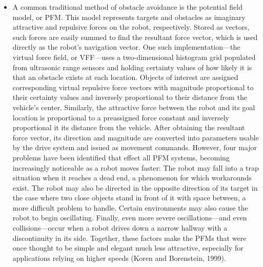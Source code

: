 \documentclass{article}
\begin{document}
\begin{itemize}
\item{A common traditional method of obstacle avoidance is the potential field model, or PFM.  This model represents targets and obstacles as imaginary attractive and repulsive forces on the robot, respectively.  Stored as vectors, such forces are easily summed to find the resultant force vector, which is used directly as the robot's navigation vector.  One such implementation---the virtual force field, or VFF---uses a two-dimensional histogram grid populated from ultrasonic range sensors and holding certainty values of how likely it is that an obstacle exists at each location.  Objects of interest are assigned corresponding virtual repulsive force vectors with magnitude proportional to their certainty values and inversely proportional to their distance from the vehicle's center.  Similarly, the attractive force between the robot and its goal location is proportional to a preassigned force constant and inversely proportional it its distance from the vehicle.  After obtaining the resultant force vector, its direction and magnitude are converted into parameters usable by the drive system and issued as movement commands.  However, four major problems have been identified that effect all PFM systems, becoming increasingly noticeable as a robot moves faster:  The robot may fall into a trap situation when it reaches a dead end, a phenomenon for which workarounds exist.  The robot may also be directed in the opposite direction of its target in the case where two close objects stand in front of it with space between, a more difficult problem to handle.  Certain environments may also cause the robot to begin oscillating.  Finally, even more severe oscillations---and even collisions---occur when a robot drives down a narrow hallway with a discontinuity in its side.  Together, these factors make the PFMs that were once thought to be simple and elegant much less attractive, especially for applications relying on higher speeds (Koren and Borenstein, 1999).}

\end{itemize}
\end{document}
